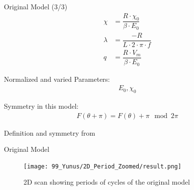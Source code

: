 \begin{frame}{Original Model (3/3)}
    \vspace{-3.0em}
    \begin{align}
        \chi    & = \dfrac{R \cdot \chi_0}{\beta \cdot E_0} \\
        \lambda & = \dfrac{-R}{L \cdot 2 \cdot \pi \cdot f} \\
        q       & = \dfrac{R \cdot V_m}{\beta \cdot E_0}
    \end{align}

Normalized and varied Parameters:
    \begin{align*}
        E_0, \chi_0
    \end{align*}

    Symmetry in this model:
    \begin{align}
        F(\theta + \pi) = F(\theta) + \pi \mod 2 \pi
    \end{align}

    \begin{flushright}
        Definition and symmetry from \cite{akyuz2022}
    \end{flushright}
\end{frame}

\begin{frame}{Original Model}
    \begin{figure}
        \centering
        \texttt{[image: 99\_Yunus/2D\_Period\_Zoomed/result.png]}
        \caption{2D scan showing periods of cycles of the original model}
    \end{figure}
\end{frame}

